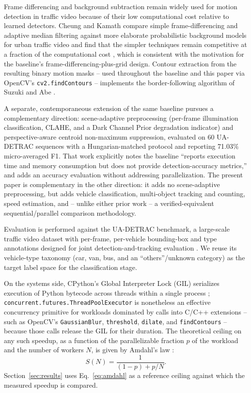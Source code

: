 \documentclass[conference]{IEEEtran}
\newcommand{\code}[1]{\texttt{#1}}
\begin{document}
Frame differencing and background subtraction remain widely used for
motion detection in traffic video because of their low computational
cost relative to learned detectors. Cheung and Kamath compare simple
frame-differencing and adaptive median filtering against more elaborate
probabilistic background models for urban traffic video and find that
the simpler techniques remain competitive at a fraction of the
computational cost \cite{cheung2004}, which is consistent with the
motivation for the baseline's frame-differencing-plus-grid design.
Contour extraction from the resulting binary motion masks -- used
throughout the baseline and this paper via OpenCV's
\code{cv2.findContours} -- implements the border-following algorithm of
Suzuki and Abe \cite{suzuki1985}.

A separate, contemporaneous extension of the same baseline
\cite{muthuraja2026} pursues a complementary direction: scene-adaptive
preprocessing (per-frame illumination classification, CLAHE, and a Dark
Channel Prior degradation indicator) and perspective-aware centroid
non-maximum suppression, evaluated on 60 UA-DETRAC sequences with a
Hungarian-matched protocol and reporting 71.03\% micro-averaged F1. That
work explicitly notes the baseline ``reports execution time and memory
consumption but does not provide detection-accuracy metrics,'' and adds
an accuracy evaluation without addressing parallelization. The present
paper is complementary in the other direction: it adds no scene-adaptive
preprocessing, but adds vehicle classification, multi-object tracking
and counting, speed estimation, and -- unlike either prior work -- a
verified-equivalent sequential/parallel comparison methodology.

Evaluation is performed against the UA-DETRAC benchmark, a large-scale
traffic video dataset with per-frame, per-vehicle bounding-box and
type annotations designed for joint detection-and-tracking evaluation
\cite{wen2020}. We reuse its vehicle-type taxonomy (car, van, bus, and an
``others''/unknown category) as the target label space for the
classification stage.

On the systems side, CPython's Global Interpreter Lock (GIL) serializes
execution of Python bytecode across threads within a single process
\cite{pythongil}; \code{concurrent.futures.ThreadPoolExecutor}
\cite{pythonfutures} is nonetheless an effective concurrency primitive
for workloads dominated by calls into C/C++ extensions -- such as
OpenCV's \code{GaussianBlur}, \code{threshold}, \code{dilate}, and
\code{findContours} -- because those calls release the GIL for their
duration. The theoretical ceiling on any such speedup, as a function of
the parallelizable fraction $p$ of the workload and the number of
workers $N$, is given by Amdahl's law \cite{amdahl1967}:
\begin{equation}
S(N) = \frac{1}{(1-p) + p/N}.
\label{eq:amdahl}
\end{equation}
Section~\ref{sec:results} uses Eq.~\eqref{eq:amdahl} as a reference
ceiling against which the measured speedup is compared.
\end{document}
